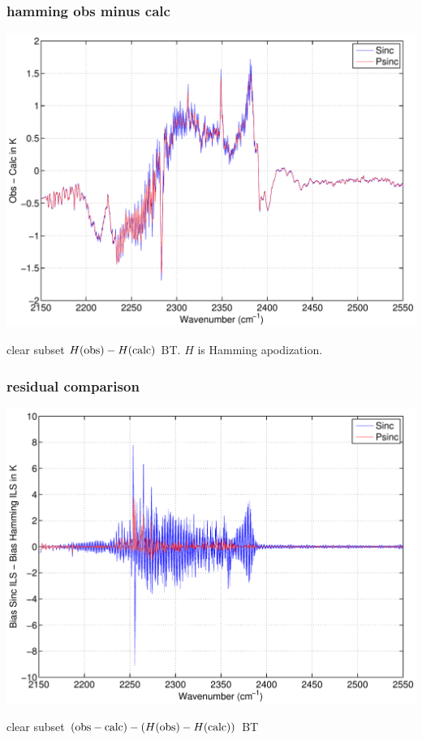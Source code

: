 \documentclass[11pt]{beamer}
\begin{document}
\begin{frame}
\frametitle{hamming obs minus calc}

\begin{center}
  \includegraphics[scale=0.4]{strow_figs/bias_ham_shortwave.pdf}
\end{center}

clear subset $H(\mbox{obs}) - H(\mbox{calc})$ BT.  $H$ is Hamming apodization.

\end{frame}
\begin{frame}
\frametitle{residual comparison}

\begin{center}
  \includegraphics[scale=0.4]{strow_figs/bias_sinc_minus_bias_ham.pdf}
\end{center}

clear subset $(\mbox{obs} - \mbox{calc}) - (H(\mbox{obs}) - H(\mbox{calc}))$ BT

\end{frame}
\end{document}
